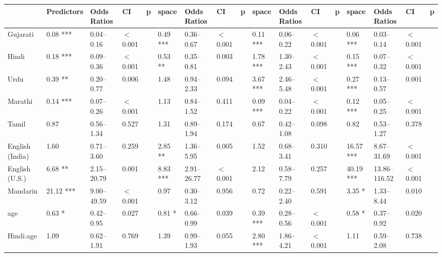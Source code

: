 \begin{table}[ht]
\centering
\begin{tabular}{}
  \hline
 & Predictors & Odds Ratios & CI & p & space & Odds Ratios & CI & p & space & Odds Ratios & CI & p & space & Odds Ratios & CI & p \\ 
  \hline
Gujarati & 0.08 *** & 0.04--0.16 & $<$0.001 &  & 0.49 *** & 0.36--0.67 & $<$0.001 &  & 0.11 *** & 0.06--0.22 & $<$0.001 &  & 0.06 *** & 0.03--0.14 & $<$0.001 \\ 
Hindi & 0.18 *** & 0.09--0.36 & $<$0.001 &  & 0.53 ** & 0.35--0.81 & 0.003 &  & 1.78 *** & 1.30--2.43 & $<$0.001 &  & 0.15 *** & 0.07--0.32 & $<$0.001 \\ 

Urdu & 0.39 ** & 0.20--0.77 & 0.006 &  & 1.48 & 0.94--2.33 & 0.094 &  & 3.67 *** & 2.46--5.48 & $<$0.001 &  & 0.27 *** & 0.13--0.57 & 0.001 \\ 

Marathi & 0.14 *** & 0.07--0.26 & $<$0.001 &  & 1.13 & 0.84--1.52 & 0.411 &  & 0.09 *** & 0.04--0.22 & $<$0.001 &  & 0.12 *** & 0.05--0.25 & $<$0.001 \\ 

Tamil & 0.87 & 0.56--1.34 & 0.527 &  & 1.31 & 0.89--1.94 & 0.174 &  & 0.67 & 0.42--1.08 & 0.098 &  & 0.82 & 0.53--1.27 & 0.378 \\ 

English (India) & 1.60 & 0.71--3.60 & 0.259 &  & 2.85 ** & 1.36--5.95 & 0.005 &  & 1.52 & 0.68--3.41 & 0.310 &  & 16.57 *** & 8.67--31.69 & $<$0.001 \\ 

English (U.S.) & 6.68 ** & 2.15--20.79 & 0.001 &  & 8.83 *** & 2.91--26.77 & $<$0.001 &  & 2.12 & 0.58--7.79 & 0.257 &  & 40.19 *** & 13.86--116.52 & $<$0.001 \\ 

Mandarin & 21.12 *** & 9.00--49.59 & $<$0.001 &  & 0.97 & 0.30--3.12 & 0.956 &  & 0.72 & 0.22--2.40 & 0.591 &  & 3.35 * & 1.33--8.44 & 0.010 \\ 

age & 0.63 * & 0.42--0.95 & 0.027 &  & 0.81 * & 0.66--0.99 & 0.039 &  & 0.39 *** & 0.28--0.56 & $<$0.001 &  & 0.58 * & 0.37--0.92 & 0.020 \\ 

Hindi:age & 1.09 & 0.62--1.91 & 0.769 &  & 1.39 & 0.99--1.93 & 0.055 &  & 2.80 *** & 1.86--4.21 & $<$0.001 &  & 1.11 & 0.59--2.08 & 0.738 \\ 


\end{tabular}
\end{table}
